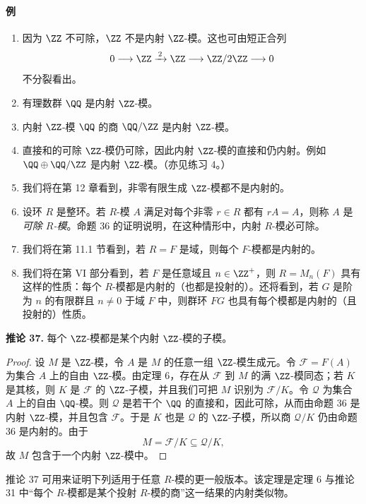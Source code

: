 \paragraph{例}
\begin{enumerate}[label=(\arabic*)]
\item 因为 $\ZZ$ 不可除，$\ZZ$ 不是内射 $\ZZ$-模。这也可由短正合列
\[
0\longrightarrow\ZZ\xrightarrow{\,2\,}\ZZ\longrightarrow\ZZ/2\ZZ\longrightarrow0
\]
不分裂看出。
\item 有理数群 $\QQ$ 是内射 $\ZZ$-模。
\item 内射 $\ZZ$-模 $\QQ$ 的商 $\QQ/\ZZ$ 是内射 $\ZZ$-模。
\item 直接和的可除 $\ZZ$-模仍可除，因此内射 $\ZZ$-模的直接和仍内射。例如 $\QQ\oplus\QQ/\ZZ$ 是内射 $\ZZ$-模。（亦见练习 4。）
\item 我们将在第 12 章看到，非零有限生成 $\ZZ$-模都不是内射的。
\item 设环 $R$ 是整环。若 $R$-模 $A$ 满足对每个非零 $r\in R$ 都有 $rA=A$，则称 $A$ 是\emph{可除 $R$-模}。命题 36 的证明说明，在这种情形中，内射 $R$-模必可除。
\item 我们将在第 11.1 节看到，若 $R=F$ 是域，则每个 $F$-模都是内射的。
\item 我们将在第 VI 部分看到，若 $F$ 是任意域且 $n\in\ZZ^+$，则 $R=M_n(F)$ 具有这样的性质：每个 $R$-模都是内射的（也都是投射的）。还将看到，若 $G$ 是阶为 $n$ 的有限群且 $n\neq0$ 于域 $F$ 中，则群环 $FG$ 也具有每个模都是内射的（且投射的）性质。
\end{enumerate}

\noindent\textbf{推论 37.} 每个 $\ZZ$-模都是某个内射 $\ZZ$-模的子模。

\begin{proof}
设 $M$ 是 $\ZZ$-模，令 $A$ 是 $M$ 的任意一组 $\ZZ$-模生成元。令 $\mathcal F=F(A)$ 为集合 $A$ 上的自由 $\ZZ$-模。由定理 6，存在从 $\mathcal F$ 到 $M$ 的满 $\ZZ$-模同态；若 $K$ 是其核，则 $K$ 是 $\mathcal F$ 的 $\ZZ$-子模，并且我们可把 $M$ 识别为 $\mathcal F/K$。令 $\mathcal Q$ 为集合 $A$ 上的自由 $\QQ$-模。则 $\mathcal Q$ 是若干个 $\QQ$ 的直接和，因此可除，从而由命题 36 是内射 $\ZZ$-模，并且包含 $\mathcal F$。于是 $K$ 也是 $\mathcal Q$ 的 $\ZZ$-子模，所以商 $\mathcal Q/K$ 仍由命题 36 是内射的。由于
\[
M=\mathcal F/K\subseteq \mathcal Q/K,
\]
故 $M$ 包含于一个内射 $\ZZ$-模中。
\end{proof}

推论 37 可用来证明下列适用于任意 $R$-模的更一般版本。该定理是定理 6 与推论 31 中“每个 $R$-模都是某个投射 $R$-模的商”这一结果的内射类似物。

